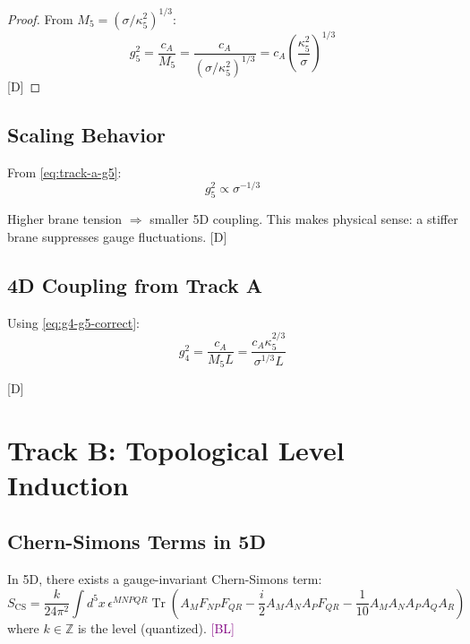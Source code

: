 \documentclass[11pt,a4paper]{article}
\newcommand{\tagD}{\textcolor{blue!70!black}{[D]}}
\newcommand{\tagBL}{\textcolor{purple}{[BL]}}
\DeclareMathOperator{\Tr}{Tr}
\begin{document}
\begin{proof}
From $M_5 = (\sigma/\kappa_5^2)^{1/3}$:
\begin{equation}
\label{eq:track-a-proof}
g_5^2 = \frac{c_A}{M_5} = \frac{c_A}{(\sigma/\kappa_5^2)^{1/3}} = c_A \left(\frac{\kappa_5^2}{\sigma}\right)^{1/3}
\end{equation}
\tagD
\end{proof}

\subsection{Scaling Behavior}

From \eqref{eq:track-a-g5}:
\begin{equation}
\label{eq:track-a-scaling}
g_5^2 \propto \sigma^{-1/3}
\end{equation}

Higher brane tension $\Rightarrow$ smaller 5D coupling. This makes physical sense:
a stiffer brane suppresses gauge fluctuations. \tagD

\subsection{4D Coupling from Track A}

Using \eqref{eq:g4-g5-correct}:
\begin{equation}
\label{eq:track-a-g4}
g_4^2 = \frac{c_A}{M_5 L} = \frac{c_A \kappa_5^{2/3}}{\sigma^{1/3} L}
\end{equation}

\tagD

\section{Track B: Topological Level Induction}

\subsection{Chern-Simons Terms in 5D}

In 5D, there exists a gauge-invariant Chern-Simons term:
\begin{equation}
\label{eq:cs-5d}
S_{\text{CS}} = \frac{k}{24\pi^2} \int d^5x\, \epsilon^{MNPQR} \Tr\left(
A_M F_{NP} F_{QR} - \frac{i}{2} A_M A_N A_P F_{QR} - \frac{1}{10} A_M A_N A_P A_Q A_R
\right)
\end{equation}
where $k \in \mathbb{Z}$ is the level (quantized). \tagBL
\end{document}
